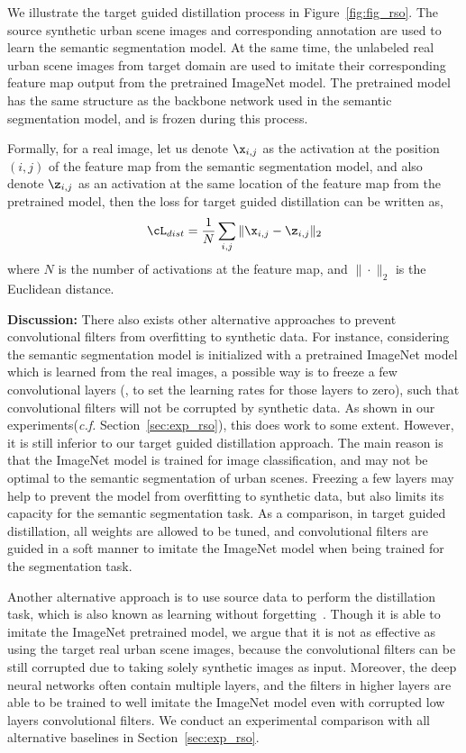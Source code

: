 \documentclass[10pt,twocolumn,letterpaper]{article}
\begin{document}
We illustrate the target guided distillation process in Figure~\ref{fig:fig_rso}. The source synthetic urban scene images and corresponding annotation are used to learn the semantic segmentation model. At the same time, the unlabeled real urban scene images from target domain are used to imitate their corresponding feature map output from the pretrained ImageNet model. The pretrained model has the same structure as the backbone network used in the semantic segmentation model, and is frozen during this process. 

Formally, for a real image, let us denote $\x_{i,j}$ as the activation at the position $(i,j)$ of the feature map from the semantic segmentation model, and also denote $\z_{i,j}$ as an activation at the same location of the feature map from the pretrained model, then the loss for target guided distillation can be written as,
\begin{eqnarray}
\label{eqn:loss_rso}
\cL_{dist} = \frac{1}{N}\sum_{i,j}\|\x_{i,j} - \z_{i,j}\|_2
\end{eqnarray}
where $N$ is the number of activations at the feature map, and $\|\cdot\|_2$ is the Euclidean distance. 

\textbf{Discussion:} There also exists other alternative approaches to prevent convolutional filters from overfitting to synthetic data. For instance, considering the semantic segmentation model is initialized with a pretrained ImageNet model which is learned from the real images, a possible way is to freeze a few convolutional layers (\ie, to set the learning rates for those layers to zero), such that convolutional filters will not be corrupted by synthetic data. As shown in our experiments(\textit{c.f.} Section~\ref{sec:exp_rso}), this does work to some extent. However, it is still inferior to our target guided distillation approach. The main reason is that the ImageNet model is trained for image classification, and may not be optimal to the semantic segmentation of urban scenes. Freezing a few layers may help to prevent the model from overfitting to synthetic data, but also limits its capacity for the semantic segmentation task. As a comparison, in target guided distillation, all weights are allowed to be tuned, and convolutional filters are guided in a soft manner to imitate the ImageNet model when being trained for the segmentation task. 

Another alternative approach is to use source data to perform the distillation task, which is also known as learning without forgetting~\cite{li2016learning}. Though it is able to imitate the ImageNet pretrained model, we argue that it is not as effective as  using the target real urban scene images, because the convolutional filters can be still corrupted due to taking solely synthetic images as input. Moreover, the deep neural networks often contain multiple layers, and the filters in higher layers are able to be trained to well imitate the ImageNet model even with corrupted low layers convolutional filters. We conduct an experimental comparison with all alternative baselines in Section~\ref{sec:exp_rso}. 
\end{document}
